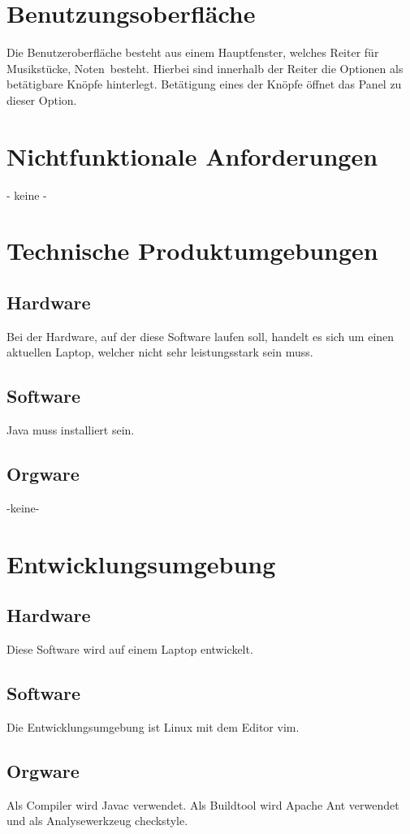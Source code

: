 \documentclass[10pt]{scrartcl}
\begin{document}
\section{Benutzungsoberfläche}
Die Benutzeroberfläche besteht aus einem Hauptfenster, welches Reiter für \glqq Musikstücke\grqq, \glqq Noten\grqq~besteht. Hierbei sind innerhalb der Reiter die Optionen als betätigbare Knöpfe hinterlegt. Betätigung eines der Knöpfe öffnet das Panel zu dieser Option.
\section{Nichtfunktionale Anforderungen}
- keine -
\section{Technische Produktumgebungen}
\subsection{Hardware}
Bei der Hardware, auf der diese Software laufen soll, handelt es sich um einen aktuellen Laptop, welcher nicht sehr leistungsstark sein muss.
\subsection{Software}
Java muss installiert sein.
\subsection{Orgware}
-keine-

\section{Entwicklungsumgebung}
\subsection{Hardware}
Diese Software wird auf einem Laptop entwickelt.
\subsection{Software}
Die Entwicklungsumgebung ist Linux mit dem Editor vim.  
\subsection{Orgware}
Als Compiler wird Javac verwendet. Als Buildtool wird Apache Ant verwendet und als Analysewerkzeug checkstyle.
\end{document}
